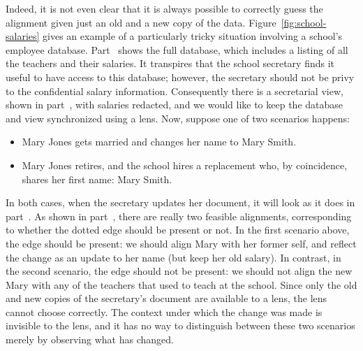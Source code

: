 Indeed, it is not even clear that it is always possible to correctly guess
the alignment given just an old and a new copy of the data.
Figure~\ref{fig:school-salaries} gives an example of a particularly tricky
situation involving a school's employee database.
Part~ shows the full database, which includes
a listing of all the teachers and their salaries. It transpires that the
school secretary finds it useful to have access to this database; however,
the secretary should not be privy to the confidential salary information.
Consequently there is a secretarial view, shown in
part~, with salaries redacted, and we
would like to keep the database and view synchronized using a \map lens.
Now, suppose one of two scenarios happens:
\begin{itemize}
    \item Mary Jones gets married and changes her name to Mary Smith.
    \item Mary Jones retires, and the school hires a replacement who, by
        coincidence, shares her first name: Mary Smith.
\end{itemize}
In both cases, when the secretary updates her document, it will look as it
does in part~. As shown in
part~, there are really two feasible
alignments, corresponding to whether the dotted edge should be present or
not. In the first scenario above, the edge should be present: we should
align Mary with her former self, and reflect the change as an update to her
name (but keep her old salary). In contrast, in the second scenario, the
edge should not be present: we should not align the new Mary with any of the
teachers that used to teach at the school. Since only the old and new copies
of the secretary's document are available to a lens, the lens cannot choose
correctly. The context under which the change was made is invisible to the
lens, and it has no way to distinguish between these two scenarios merely by
observing what has changed.

